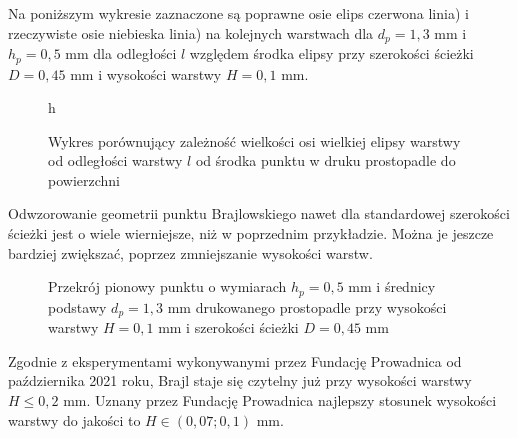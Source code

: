 \documentclass[12pt,a4paper]{article}
\begin{document}
Na poniższym wykresie zaznaczone są poprawne osie elips czerwona linia) i rzeczywiste osie niebieska linia) na kolejnych warstwach dla $d_p = 1{,}3 \text{ mm}$ i $h_p = 0{,}5 \text{ mm}$ dla odległości $l$ względem środka elipsy przy szerokości ścieżki $D=0{,}45 \text{ mm}$ i wysokości warstwy $H=0{,}1 \text{ mm}$.

\begin{figure}{h}
\caption{Wykres porównujący zależność wielkości osi wielkiej elipsy warstwy od odległości warstwy $l$ od środka punktu w druku prostopadle do powierzchni}
\end{figure}

Odwzorowanie geometrii punktu Brajlowskiego nawet dla standardowej szerokości ścieżki jest o wiele wierniejsze, niż w poprzednim przykładzie. Można je jeszcze bardziej zwiększać, poprzez zmniejszanie wysokości warstw.

\begin{figure}
\caption{Przekrój pionowy punktu o wymiarach $h_p = 0{,}5 \text{ mm}$ i średnicy podstawy $d_p=1{,}3 \text{ mm}$ drukowanego prostopadle przy wysokości warstwy $H = 0{,}1 \text{ mm}$ i szerokości ścieżki $D = 0{,}45 \text{ mm}$}
\end{figure}

Zgodnie z eksperymentami wykonywanymi przez Fundację Prowadnica od października 2021 roku, Brajl staje się czytelny już przy wysokości warstwy $H \leq 0{,}2 \text{ mm}$. Uznany przez Fundację Prowadnica najlepszy stosunek wysokości warstwy do jakości to $H \in (0{,}07; 0{,}1) \text{ mm}$.
\end{document}
